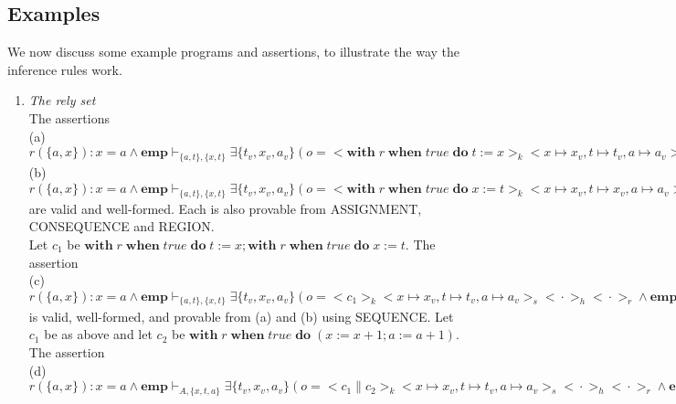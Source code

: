 \documentclass{lmcs} %
\theoremstyle{plain}\newtheorem{satz}[thm]{Satz} %
\begin{document}
\subsection*{Examples}
We now discuss some example programs and assertions, to illustrate the way the inference rules work.
\begin{enumerate}
\item \emph{The rely set}\\
The assertions\\
(a)\;\;$r(\{a,x\}):x=a \land \mathbf{emp}\vdash_{\{a,t\},\{x,t\}}\exists \{t_v,x_v,a_v\}(o=<\!\!\mathbf{with}\;r\;\mathbf{when}\;true\;\mathbf{do}\;t:=x\!\!>_k<\!\!x\mapsto x_v,t\mapsto t_v,a\mapsto a_v\!\!>_s<\!\!\cdot\!\!>_h<\!\!\cdot\!\!>_r\land \mathbf{emp})\Downarrow\exists \{t_v,x_v,a_v\}(o=<\!\!\cdot\!\!>_k<\!\!x\mapsto x_v,t\mapsto x_v, a\mapsto a_v\!\!>_s<\!\!\cdot\!\!>_h<\!\!\cdot\!\!>_r\land t=a\land \mathbf{emp})$\\
  (b)\;\;$r(\{a,x\}):x=a \land \mathbf{emp}\vdash_{\{a,t\},\{x,t\}}\exists \{t_v,x_v,a_v\}(o=<\!\!\mathbf{with}\;r\;\mathbf{when}\;true\;\mathbf{do}\;x:=t\!\!>_k<\!\!x\mapsto x_v,t\mapsto x_v,a\mapsto a_v\!\!>_s<\!\!\cdot\!\!>_h<\!\!\cdot\!\!>_r\land t=a\land \mathbf{emp})\Downarrow\exists \{t_v,x_v,a_v\}(o=<\!\!\cdot\!\!>_k<\!\!x\mapsto x_v,t\mapsto x_v,a\mapsto a_v\!\!>_s<\!\!\cdot\!\!>_h<\!\!\cdot\!\!>_r\land \mathbf{emp})$\\
are valid and well-formed. Each is also provable from ASSIGNMENT, CONSEQUENCE and REGION.\\
  Let $c_1$ be $\mathbf{with}\;r\;\mathbf{when}\;true\;\mathbf{do}\;t:=x; \mathbf{with}\;r\;\mathbf{when}\;true\;\mathbf{do}\;x:=t$. The assertion\\
  (c)\;\;$r(\{a,x\}):x=a \land \mathbf{emp}\vdash_{\{a,t\},\{x,t\}}\exists \{t_v,x_v,a_v\}(o=<\!\!c_1\!\!>_k<\!\!x\mapsto x_v,t\mapsto t_v, a\mapsto a_v\!\!>_s<\!\!\cdot\!\!>_h<\!\!\cdot\!\!>_r\land \mathbf{emp})\Downarrow\exists \{t_v,x_v,a_v\}(o=<\!\!\cdot\!\!>_k<\!\!x\mapsto x_v,t\mapsto x_v, a\mapsto a_v\!\!>_s<\!\!\cdot\!\!>_h<\!\!\cdot\!\!>_r\land \mathbf{emp})$\\
  is valid, well-formed, and provable from (a) and (b) using SEQUENCE. Let $c_1$ be as above and let $c_2$ be $\mathbf{with}\;r\;\mathbf{when}\;true\;\mathbf{do}\;(x:=x+1;a:=a+1)$. The assertion\\
(d)\;\;$r(\{a,x\}):x=a \land \mathbf{emp}\vdash_{A,\{x,t,a\}}\exists \{t_v,x_v,a_v\}(o=<\!\!c_1\parallel c_2\!\!>_k<\!\!x\mapsto x_v,t\mapsto t_v, a\mapsto a_v\!\!>_s<\!\!\cdot\!\!>_h<\!\!\cdot\!\!>_r\land \mathbf{emp})\Downarrow\exists \{t_v',x_v',a_v'\}(o=<\!\!\cdot\!\!>_k<\!\!x\mapsto x_v',t\mapsto t_v', a\mapsto a_v'\!\!>_s<\!\!\cdot\!\!>_h<\!\!\cdot\!\!>_r\land \mathbf{emp})$\\

\end{enumerate}
\end{document}
